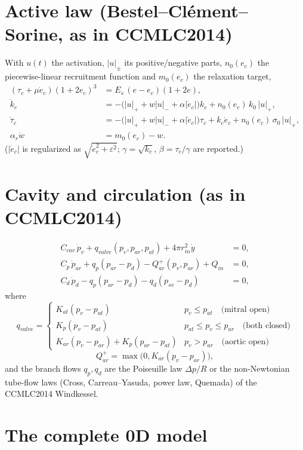 \documentclass[11pt,a4paper]{article}
\newcommand{\rin}{r_{in}}
\begin{document}
\section{Active law (Bestel--Cl\'ement--Sorine, as in CCMLC2014)}

With $u(t)$ the activation, $|u|_\pm$ its positive/negative parts, $n_0(e_c)$ the piecewise-linear recruitment function and $m_0(e_c)$ the relaxation target,
\begin{align}
(\tau_c+\mu\dot e_c)(1+2e_c)^3&=E_s\,(e-e_c)(1+2e), \label{eq:ec}\\
\dot k_c&=-\big(|u|_++w|u|_-+\alpha|\dot e_c|\big)k_c+n_0(e_c)\,k_0\,|u|_+, \label{eq:kc}\\
\dot\tau_c&=-\big(|u|_++w|u|_-+\alpha|\dot e_c|\big)\tau_c+k_c\dot e_c+n_0(e_c)\,\sigma_0\,|u|_+, \label{eq:tauc}\\
\alpha_r\dot w&=m_0(e_c)-w . \label{eq:w}
\end{align}
($|\dot e_c|$ is regularized as $\sqrt{\dot e_c^2+\varepsilon^2}$; $\gamma=\sqrt{k_c}$, $\beta=\tau_c/\gamma$ are reported.)

\section{Cavity and circulation (as in CCMLC2014)}

\begin{align}
C_{cav}\,\dot p_v+q_{valve}(p_v,p_{ar},p_{at})+4\pi\rin^2\dot y&=0, \label{eq:cavity}\\
C_p\,\dot p_{ar}+q_p(p_{ar}-p_d)-Q_{ar}^+(p_v,p_{ar})+Q_{in}&=0, \label{eq:par}\\
C_d\,\dot p_d-q_p(p_{ar}-p_d)-q_d(p_{sv}-p_d)&=0, \label{eq:pd}
\end{align}
where
\[
q_{valve}=\begin{cases}K_{at}(p_v-p_{at}) & p_v\le p_{at}\quad\text{(mitral open)}\\ K_p(p_v-p_{at}) & p_{at}\le p_v\le p_{ar}\quad\text{(both closed)}\\ K_{ar}(p_v-p_{ar})+K_p(p_{ar}-p_{at}) & p_v>p_{ar}\quad\text{(aortic open)}\end{cases}
\]
\[
Q_{ar}^+=\max\big(0,K_{ar}(p_v-p_{ar})\big),
\]
and the branch flows $q_p,q_d$ are the Poiseuille law $\Delta p/R$ or the non-Newtonian tube-flow laws (Cross, Carreau--Yasuda, power law, Quemada) of the CCMLC2014 Windkessel.

\section{The complete 0D model}
\end{document}
